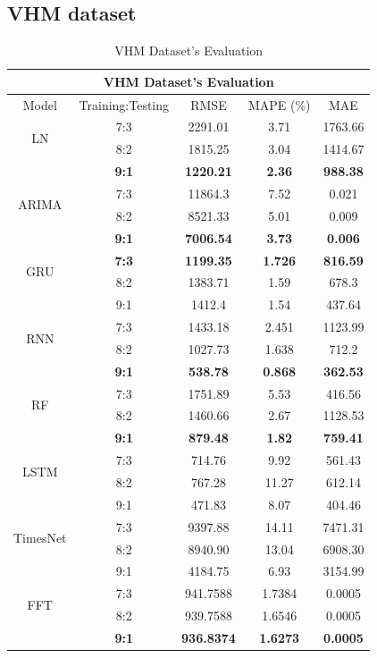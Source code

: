 \documentclass{ieeeojies}
\begin{document}
\subsection{VHM dataset} 

  \begin{table}[H]
    \centering
    \begin{tabular}{|c|c|c|c|c|}
           \hline
           \multicolumn{5}{|c|}{\textbf{VHM Dataset's Evaluation}}\\
           \hline
           \centering Model & Training:Testing & RMSE & MAPE (\%) & MAE\\
           \hline
           \multirow{2}{*}{LN} & 7:3 & 2291.01 & 3.71 & 1763.66 \\ & 8:2 & 1815.25 & 3.04 & 1414.67 \\ & \textbf{9:1} & \textbf{1220.21} & \textbf{2.36} & \textbf{988.38}\\
           \hline
           \multirow{2}{*}{ARIMA} & 7:3&11864.3&7.52&0.021\\ & 8:2&8521.33&5.01&0.009 \\ & \textbf{9:1} & \textbf{7006.54} & \textbf{3.73} & \textbf{0.006}\\
           \hline
           \multirow{2}{*}{GRU} & \textbf{7:3} & \textbf{1199.35} & \textbf{1.726} & \textbf{816.59} \\ & 8:2 &  1383.71 & 1.59 &678.3 \\ & 9:1 & 1412.4	&1.54&437.64\\
           \hline
           \multirow{2}{*}{RNN} & 7:3 &  1433.18 &  2.451 & 1123.99 \\ & 8:2 &  1027.73 & 1.638 &  712.2\\ & \textbf{9:1} & \textbf{538.78} & \textbf{0.868} & \textbf{362.53} \\
           \hline
           \multirow{2}{*}{RF} & 7:3	& 1751.89 & 5.53 &  416.56 \\ & 8:2 & 1460.66 & 2.67 & 1128.53 \\ & \textbf{9:1} & \textbf{879.48} & \textbf{1.82} & \textbf{759.41}\\
           \hline
           \multirow{2}{*}{LSTM} & 7:3 & 714.76 & 9.92 & 561.43 \\ & 8:2 & 767.28 & 11.27 & 612.14 \\ & 9:1 & 471.83	&8.07&404.46\\
           \hline
           \multirow{2}{*}{TimesNet} & 7:3 & 9397.88 & 14.11 & 7471.31 \\ & 8:2 & 8940.90 & 13.04 & 6908.30 \\ & 9:1 & 4184.75	& 6.93 &3154.99\\
           \hline
           \multirow{2}{*}{FFT} & 7:3 & 941.7588 &  1.7384 &  0.0005 \\ & 8:2 & 939.7588 &  1.6546 &  0.0005 \\ & \textbf{9:1} & \textbf{936.8374} & \textbf{1.6273} & \textbf{0.0005}\\
           \hline
      \end{tabular}
      \caption{VHM Dataset's Evaluation}
      \label{vcbresult}
  \end{table}
\end{document}
